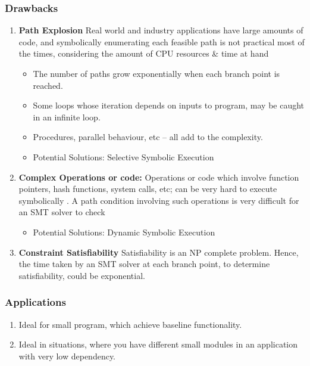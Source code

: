 \documentclass[11pt]{llncs}
\begin{document}
		\subsubsection{Drawbacks}
			\begin{enumerate}
				\item \textbf{Path Explosion} \cite{2_Survey_SE}\cite{5_Wiki_SE}
					Real world and industry applications have large amounts of code, and symbolically enumerating each feasible path is not practical most of the times, considering the amount of CPU resources \& time at hand
					\begin{itemize}
						\item The number of paths grow exponentially when each branch point is reached.
						\item Some loops whose iteration depends on inputs to program, may be caught in an infinite loop.
						\item Procedures, parallel behaviour, etc – all add to the complexity. \cite{7_UW_SE}
						\item Potential Solutions: Selective Symbolic Execution
					\end{itemize}

				\vspace{2mm}

				\item \textbf{Complex Operations or code:}
					Operations or code which involve function pointers, hash functions, system calls, etc; can be very hard to execute symbolically \cite{7_UW_SE}. A path condition involving such operations is very difficult for an SMT solver to check
					\begin{itemize}
						\item Potential Solutions: Dynamic Symbolic Execution
					\end{itemize}
				
				\vspace{2mm}

				\item \textbf{Constraint Satisfiability}
					Satisfiability is an NP complete problem. Hence, the time taken by an SMT solver at each branch point, to determine satisfiability, could be exponential.
			\end{enumerate}


		\subsubsection{Applications}
			\begin{enumerate}
				\item Ideal for small program, which achieve baseline functionality.
				\item Ideal in situations, where you have different small modules in an application with very low dependency.
			\end{enumerate}
\end{document}
